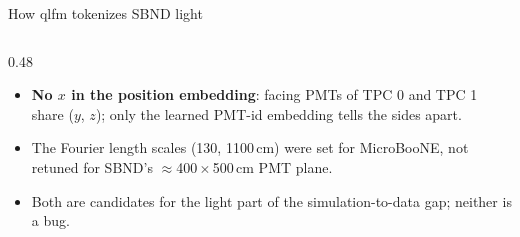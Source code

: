 \documentclass[aspectratio=169,10pt]{beamer}
\begin{document}
\begin{frame}{How qlfm tokenizes SBND light}
\begin{columns}[T]
    \begin{column}{0.48\textwidth}
      \begin{itemize}\setlength{\itemsep}{1pt}
        \item \textbf{No $x$ in the position embedding}: facing PMTs of TPC 0 and TPC 1 share ($y$, $z$); only the learned PMT-id
          embedding tells the sides apart.
        \item The Fourier length scales (130, 1100\,cm) were set for MicroBooNE, not retuned for SBND's $\approx$400\,$\times$\,500\,cm PMT plane.
        \item Both are candidates for the light part of the simulation-to-data gap; neither is a bug.
      \end{itemize}
    \end{column}
  \end{columns}
\end{frame}

\end{document}
